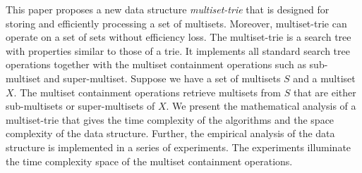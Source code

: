 This paper proposes a new data structure \emph{multiset-trie} that is designed for storing and efficiently processing a set of multisets. Moreover, multiset-trie can operate on a set of sets without efficiency loss.
%
The multiset-trie is a search tree with properties similar to those of a trie. It implements all standard search tree operations together with the multiset containment operations such as sub-multiset and super-multiset. Suppose we have a set of multisets $S$ and a multiset $X$. The multiset containment operations retrieve multisets from $S$ that are either sub-multisets or super-multisets of $X$. 
%
We present the mathematical analysis of a multiset-trie that gives the time complexity of the algorithms and the space complexity of the data structure. Further, the empirical analysis of the data structure is implemented in a series of experiments. The experiments illuminate the time complexity space of the multiset containment operations.
